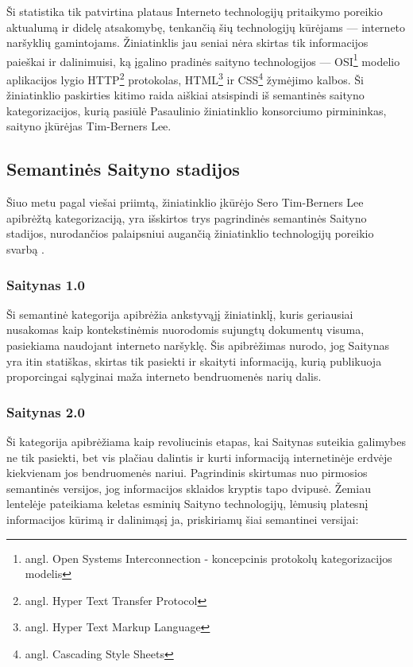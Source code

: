 \documentclass{VUMIFPSkursinis}
\begin{document}
Ši statistika tik patvirtina plataus Interneto technologijų pritaikymo poreikio aktualumą ir didelę atsakomybę, tenkančią šių technologijų kūrėjams — interneto naršyklių gamintojams. Žiniatinklis jau seniai nėra skirtas tik informacijos paieškai ir dalinimuisi, ką įgalino pradinės saityno technologijos — OSI\footnote{angl. Open Systems Interconnection - koncepcinis protokolų kategorizacijos modelis} modelio aplikacijos lygio HTTP\footnote{angl. Hyper Text Transfer Protocol} protokolas, HTML\footnote{angl. Hyper Text Markup Language} ir CSS\footnote{angl. Cascading Style Sheets} žymėjimo kalbos. Ši žiniatinklio paskirties kitimo raida aiškiai atsispindi iš semantinės saityno kategorizacijos, kurią pasiūlė Pasaulinio žiniatinklio konsorciumo pirmininkas, saityno įkūrėjas Tim-Berners Lee.

\subsection{Semantinės Saityno stadijos}
Šiuo metu pagal viešai priimtą, žiniatinklio įkūrėjo Sero Tim-Berners Lee apibrėžtą kategorizaciją, yra išskirtos trys pagrindinės semantinės Saityno stadijos, nurodančios palaipsniui augančią žiniatinklio technologijų poreikio svarbą \cite{NS09}.

\subsubsection{Saitynas 1.0}
Ši semantinė kategorija apibrėžia ankstyvąjį žiniatinklį, kuris geriausiai nusakomas kaip kontekstinėmis nuorodomis sujungtų dokumentų visuma, pasiekiama naudojant interneto naršyklę. Šis apibrėžimas nurodo, jog Saitynas yra itin statiškas, skirtas tik pasiekti ir skaityti informaciją, kurią publikuoja proporcingai sąlyginai maža interneto bendruomenės narių dalis.

\subsubsection{Saitynas 2.0}
Ši kategorija apibrėžiama kaip revoliucinis etapas, kai Saitynas suteikia galimybes ne tik pasiekti, bet vis plačiau dalintis ir kurti informaciją internetinėje erdvėje kiekvienam jos bendruomenės nariui. Pagrindinis skirtumas nuo pirmosios semantinės versijos, jog informacijos sklaidos kryptis tapo dvipusė. Žemiau lentelėje pateikiama keletas esminių Saityno technologijų, lėmusių platesnį informacijos kūrimą ir dalinimąsį ja, priskiriamų šiai semantinei versijai: 
\end{document}
